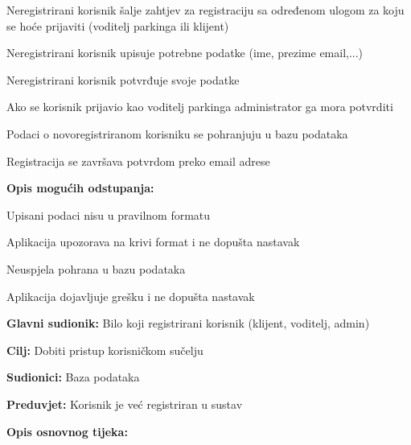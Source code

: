 \begin{packed_item}
\begin{packed_item}
\begin{packed_enum}
    					\item Neregistrirani korisnik šalje zahtjev za registraciju sa određenom ulogom za koju se hoće prijaviti (voditelj parkinga ili klijent)
    					\item Neregistrirani korisnik upisuje potrebne podatke (ime, prezime email,...)
    					\item Neregistrirani korisnik potvrđuje svoje podatke
    					\item Ako se korisnik prijavio kao voditelj parkinga administrator ga mora potvrditi
    					\item Podaci o novoregistriranom korisniku se pohranjuju u bazu podataka
    					\item Registracija se završava potvrdom preko email adrese
    				\end{packed_enum}
    				
    				\item  \textbf{Opis mogućih odstupanja:}
    				
    				\item[] \begin{packed_item}
    					
    					\item[2.a] Upisani podaci nisu u pravilnom formatu
    					\item[] \begin{packed_enum}
    						
    						\item Aplikacija upozorava na krivi format i ne dopušta nastavak
    						
    					\end{packed_enum}
    					\item[5.a] Neuspjela pohrana u bazu podataka
    					\item[] \begin{packed_enum}
    						
    						\item Aplikacija dojavljuje grešku i ne dopušta nastavak
    						
    					\end{packed_enum}
    					
    				\end{packed_item}
    			\end{packed_item}
    				\noindent \underbar{\textbf{UC12 - Prijava u sustav}}
    			\begin{packed_item}
    				
    				\item \textbf{Glavni sudionik:} Bilo koji registrirani korisnik (klijent, voditelj, admin)
    				\item  \textbf{Cilj:} Dobiti pristup korisničkom sučelju  
    				\item  \textbf{Sudionici:} Baza podataka
    				\item  \textbf{Preduvjet:} Korisnik je već registriran u sustav
    				\item  \textbf{Opis osnovnog tijeka:}
    				

\end{packed_item}
\end{packed_item}
